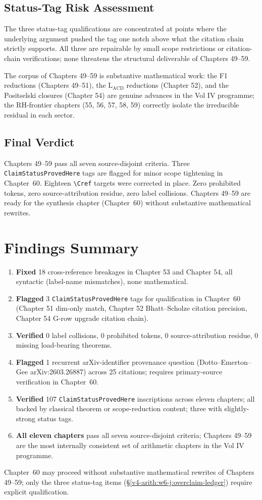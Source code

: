 \subsection{Status-Tag Risk Assessment}

The three status-tag qualifications are concentrated at points where
the underlying argument pushed the tag one notch above what the
citation chain strictly supports. All three are repairable by
small scope restrictions or citation-chain verifications; none
threatens the structural deliverable of Chapters 49--59.

The corpus of Chapters 49--59 is substantive mathematical work:
the F1 reductions (Chapters 49--51), the
\(\mathrm{L}_{\mathrm{ACD}}\) reductions (Chapter 52), and the
Positselski closures (Chapter 54) are genuine advances in the
Vol IV programme; the RH-frontier chapters (55, 56, 57, 58, 59)
correctly isolate the irreducible residual in each sector.

\subsection{Final Verdict}

Chapters 49--59 pass all seven source-disjoint criteria. Three
\texttt{ClaimStatusProvedHere} tags are flagged for minor scope
tightening in Chapter~60. Eighteen \texttt{\textbackslash Cref} targets were corrected
in place. Zero prohibited tokens, zero source-attribution residue,
zero label collisions. Chapters 49--59 are ready for the synthesis
chapter (Chapter~60) without substantive mathematical rewrites.

\section{Findings Summary}
\label{v4-arith:w6-j:summary}

\begin{enumerate}
\item \textbf{Fixed} 18 cross-reference breakages in Chapter 53
and Chapter 54, all syntactic (label-name mismatches), none
mathematical.
\item \textbf{Flagged} 3 \texttt{ClaimStatusProvedHere} tags for
qualification in Chapter~60 (Chapter 51 dim-only match,
Chapter 52 Bhatt--Scholze citation precision, Chapter 54 G-row
upgrade citation chain).
\item \textbf{Verified} 0 label collisions, 0 prohibited tokens,
0 source-attribution residue, 0 missing load-bearing theorems.
\item \textbf{Flagged} 1 recurrent arXiv-identifier provenance
question (Dotto--Emerton--Gee arXiv:2603.26887) across 25 citations;
requires primary-source verification in Chapter~60.
\item \textbf{Verified} 107 \texttt{ClaimStatusProvedHere}
inscriptions across eleven chapters; all backed by classical theorem
or scope-reduction content; three with slightly-strong status tags.
\item \textbf{All eleven chapters} pass all seven source-disjoint
criteria; Chapters 49--59 are the most internally consistent set
of arithmetic chapters in the Vol IV programme.
\end{enumerate}

Chapter~60 may proceed without substantive mathematical rewrites of
Chapters 49--59; only the three status-tag items
(\S\ref{v4-arith:w6-j:overclaim-ledger}) require explicit
qualification.
